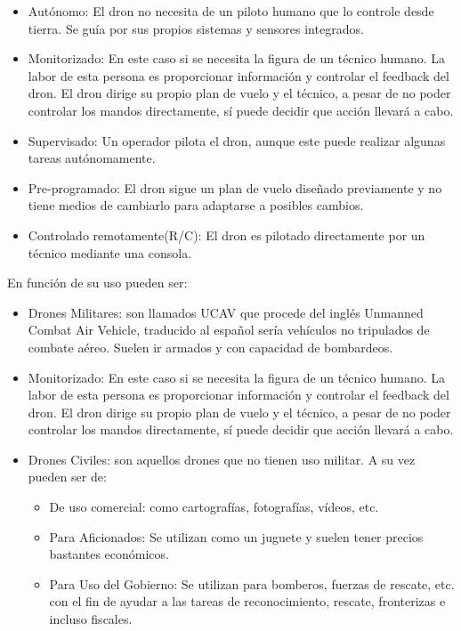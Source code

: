 \begin{itemize}
\item Autónomo: El dron no necesita de un piloto humano que lo controle desde tierra. Se guía por sus propios sistemas y sensores integrados. 
\item Monitorizado: En este caso si se necesita la figura de un técnico humano. La labor de esta persona es proporcionar información y controlar el feedback del dron. El dron dirige su propio plan de vuelo y el técnico, a pesar de no poder controlar los mandos directamente, sí puede decidir que acción llevará a cabo.
\item Supervisado: Un operador pilota el dron, aunque este puede realizar algunas tareas autónomamente.
\item Pre-programado: El dron sigue un plan de vuelo diseñado previamente y no tiene medios de cambiarlo para adaptarse a posibles cambios.
\item Controlado remotamente(R/C): El dron es pilotado directamente por un técnico mediante una consola.
\end{itemize}

En función de su uso pueden ser:

\begin{itemize}
\item Drones Militares: son llamados UCAV que procede del inglés Unmanned Combat Air Vehicle, traducido al español sería vehículos no tripulados de combate aéreo. Suelen ir armados y con capacidad de bombardeos.
\item Monitorizado: En este caso si se necesita la figura de un técnico humano. La labor de esta persona es proporcionar información y controlar el feedback del dron. El dron dirige su propio plan de vuelo y el técnico, a pesar de no poder controlar los mandos directamente, sí puede decidir que acción llevará a cabo.
\item Drones Civiles: son aquellos drones que no tienen uso militar. A su vez pueden ser de: \begin{itemize}
\item De uso comercial: como cartografías, fotografías, vídeos, etc.
\item Para Aficionados: Se utilizan como un juguete y suelen tener precios bastantes económicos.
\item Para Uso del Gobierno: Se utilizan para bomberos, fuerzas de rescate, etc. con el fin de ayudar a las tareas de reconocimiento, rescate, fronterizas e incluso fiscales.
\end{itemize}
\end{itemize}

